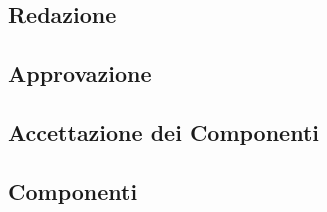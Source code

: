 \documentclass[../piano_di_progetto.tex]{subfiles}
\begin{document}
\subsection{Redazione}%
\label{sub:red}

\subsection{Approvazione}%
\label{sub:app}

\subsection{Accettazione dei Componenti}%
\label{sub:acc_comp}

\subsection{Componenti}%
\label{sub:comp}
\end{document}
